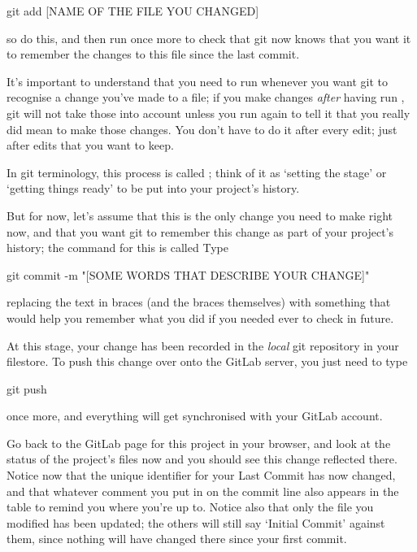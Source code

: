 \begin{ttoutenv}
git add [NAME OF THE FILE YOU CHANGED]
\end{ttoutenv}

so do this, and then run  once more to check that git now knows that you want it to remember the changes to this file since the last commit. 

It's important to understand that you need to run  whenever you want git to recognise a change you've made to a file; if you make changes \emph{after} having run , git will not take those into account unless you run  again to tell it that you really did mean to make those changes. You don't have to do it after every edit; just after edits that you want to keep. 

In git terminology, this process is called ; think of it as `setting the stage' or `getting things ready' to be put into your project's history. 

But for now, let's assume that this is the only change you need to make right now, and that you want  git to remember this change as part of your project's history; the command for this is called  Type

\begin{ttoutenv}
git commit -m "[SOME WORDS THAT DESCRIBE YOUR CHANGE]"
\end{ttoutenv}

replacing the text in braces (and the braces themselves) with something that would help you remember what you did if you needed ever to check in future. 

At this stage, your change has been recorded in the \emph{local} git repository in your filestore. To push this change over onto the GitLab server, you just need to type

\begin{ttoutenv}
git push
\end{ttoutenv}

once more, and everything will get synchronised with your GitLab account.

Go back to the GitLab page for this project in your browser, and look at the status of the project's files now and you should see this change reflected there. Notice now that the unique identifier for your Last Commit has now changed, and that whatever comment you put in on the commit line also appears in the table to remind you where you're up to. 
Notice also that only the file you modified has been updated; the others will still say `Initial Commit' against them, since nothing will have changed there since your first commit. 

